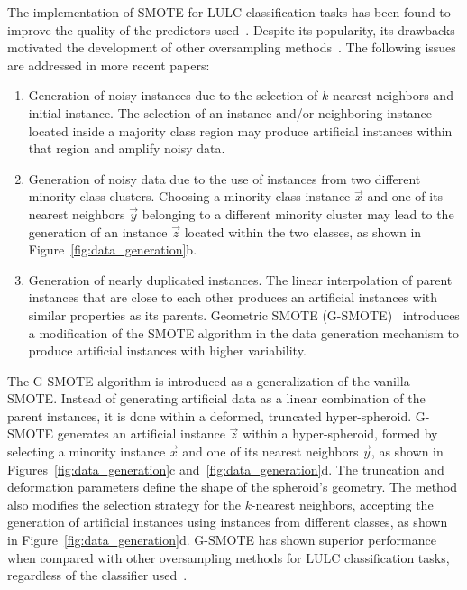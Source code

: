 \documentclass[preprint,12pt]{elsarticle}
\begin{document}
The implementation of SMOTE for LULC classification tasks has been found to
improve the quality of the predictors used~\cite{Jozdani2019,Bogner2018}.
Despite its popularity, its drawbacks motivated the development of other
oversampling methods~\cite{Douzas2019}. The following issues are addressed in
more recent papers:

\begin{enumerate}
    \item Generation of noisy instances due to the selection of $k$-nearest
        neighbors and initial instance. The selection of an instance and/or
        neighboring instance located inside a majority class region may
        produce artificial instances within that region and amplify noisy
        data.
    \item Generation of noisy data due to the use of instances from two
        different minority class clusters. Choosing a minority class instance
        $\overrightarrow{x}$ and one of its nearest neighbors
        $\overrightarrow{y}$ belonging to a different minority cluster may
        lead to the generation of an instance $\overrightarrow{z}$ located
        within the two classes, as shown in Figure~\ref{fig:data_generation}b.
    \item Generation of nearly duplicated instances. The linear interpolation
        of parent instances that are close to each other produces an artificial
        instances with similar properties as its parents. Geometric SMOTE
        (G-SMOTE)~\cite{Douzas2019} introduces a modification of the SMOTE
        algorithm in the data generation mechanism to produce artificial
        instances with higher variability.
\end{enumerate}

The G-SMOTE algorithm is introduced as a generalization of the vanilla
SMOTE\@. Instead of generating artificial data as a linear combination of the
parent instances, it is done within a deformed, truncated hyper-spheroid.
G-SMOTE generates an artificial instance $\overrightarrow{z}$ within a
hyper-spheroid, formed by selecting a minority instance $\overrightarrow{x}$
and one of its nearest neighbors $\overrightarrow{y}$, as shown in
Figures~\ref{fig:data_generation}c and~\ref{fig:data_generation}d. The
truncation and deformation parameters define the shape of the spheroid's
geometry. The method also modifies the selection strategy for the $k$-nearest
neighbors, accepting the generation of artificial instances using instances
from different classes, as shown in Figure~\ref{fig:data_generation}d. G-SMOTE
has shown superior performance when compared with other oversampling methods
for LULC classification tasks, regardless of the classifier
used~\cite{Douzas2019class}.
\end{document}
